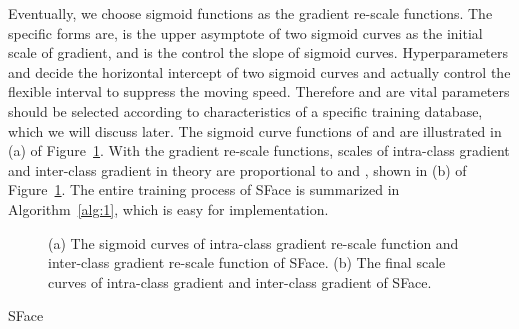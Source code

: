 \documentclass[journal,comsoc]{IEEEtran}
\begin{document}
Eventually, we choose sigmoid functions as the gradient re-scale functions. The specific forms are,
 is the upper asymptote of two sigmoid curves as the initial scale of gradient, and  is the control the slope of sigmoid curves. Hyperparameters  and  decide the horizontal intercept of two sigmoid curves and actually control the flexible interval to suppress the moving speed. Therefore  and  are vital parameters should be selected according to characteristics of a specific training database, which we will discuss later. The sigmoid curve functions of  and  are illustrated in (a) of Figure~\ref{fig:method_curve}. With the gradient re-scale functions, scales of intra-class gradient and inter-class gradient in theory are proportional to  and , shown in (b) of Figure~\ref{fig:method_curve}. The entire training process of SFace is summarized in Algorithm~\ref{alg:1}, which is easy for implementation.

\begin{figure}[htbp]
	\centering

\caption{(a) The sigmoid curves of intra-class gradient re-scale function  and inter-class gradient re-scale function  of SFace. (b) The final scale curves of intra-class gradient  and inter-class gradient  of SFace.}
\label{fig:method_curve}
\end{figure}

\begin{algorithm}[htbp]
	\caption{SFace}
	\label{alg:1}
	\LinesNumbered
\end{algorithm}
\end{document}
